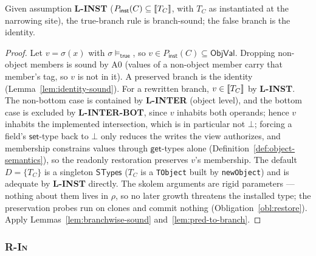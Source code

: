 \documentclass[11pt]{article}
\newcommand{\ObjVal}{\mathsf{ObjVal}}
\newcommand{\STypes}{\mathsf{STypes}}
\begin{document}
\begin{lemma}
Given assumption \textbf{L-INST}
($P_{\mathsf{inst}}(C) \subseteq \llbracket T_C \rrbracket$, with $T_C$ as instantiated at
the narrowing site), the true-branch rule is branch-sound; the false branch
is the identity.
\end{lemma}
\begin{proof}
Let $v = \sigma(x)$ with $\sigma \models_{\mathsf{true}}$, so
$v \in P_{\mathsf{inst}}(C) \subseteq \ObjVal$. Dropping non-object members
is sound by A0 (values of a non-object member carry that member's tag, so
$v$ is not in it). A preserved branch is the identity
(Lemma~\ref{lem:identity-sound}). For a rewritten branch,
$v \in \llbracket T_C \rrbracket$ by \textbf{L-INST}. The non-bottom case is contained by
\textbf{L-INTER} (object level), and the bottom case is excluded by
\textbf{L-INTER-BOT}, since $v$ inhabits both operands; hence $v$ inhabits
the implemented intersection, which is in particular not $\bot$;
forcing a field's $\mathsf{set}$-type back to $\bot$ only reduces the
writes the view authorizes, and membership constrains values through
$\mathsf{get}$-types alone (Definition~\ref{def:object-semantics}), so
the readonly restoration preserves $v$'s membership. The default
$D = \{T_C\}$ is a singleton $\STypes$ ($T_C$ is a \texttt{TObject}
built by \texttt{newObject}) and is adequate by \textbf{L-INST}
directly. The skolem arguments are rigid parameters — nothing about them
lives in $\rho$, so no later growth threatens the installed type; the
preservation probes run on clones and commit nothing
(Obligation~\ref{obl:restore}). Apply
Lemmas~\ref{lem:branchwise-sound} and~\ref{lem:pred-to-branch}.
\end{proof}

\subsubsection{\textsc{R-In}}
\label{sec:r-in}
\end{document}
